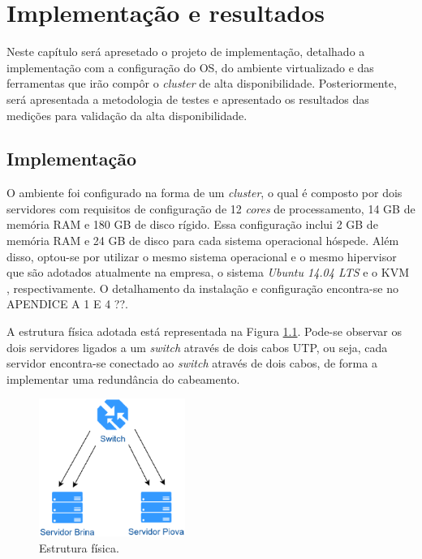 \chapter{Implementação e resultados}
\label{cap:implementacaoresultados}

Neste capítulo será apresetado o projeto de implementação, detalhado a implementação com a configuração do \ac{OS}, do ambiente virtualizado e 
das ferramentas que irão compôr o \textit{cluster} de alta disponibilidade. Posteriormente, será apresentada a metodologia de testes e 
apresentado os resultados das medições para validação da alta disponibilidade.

\section{Implementação}
\label{section:implementacao}

O ambiente foi configurado na forma de um \textit{cluster}, o qual é composto por dois servidores com requisitos de configuração 
de 12 \textit{cores} de processamento, 14 GB de memória \ac{RAM} e 180 GB de disco rígido.
Essa configuração inclui 2 GB de memória \ac{RAM} e 24 GB de disco para cada sistema operacional hóspede. Além disso, optou-se por utilizar o 
mesmo sistema operacional e o mesmo hipervisor que são adotados atualmente na empresa, o sistema \textit{Ubuntu 14.04 \ac{LTS}} e o \ac{KVM} 
\cite{kvm}, respectivamente. O detalhamento da instalação e configuração encontra-se no APENDICE A 1 E 4 ??.

A estrutura física adotada está representada na Figura \ref{fig:projeto_fisico}. Pode-se observar os dois servidores ligados a um 
\textit{switch} através de dois cabos UTP, ou seja, cada servidor encontra-se conectado ao \textit{switch} através de dois cabos, de forma a 
implementar uma redundância do cabeamento.

\begin{figure}[h!]
 \centering
 \includegraphics[width=180px]{img/projeto_fisico.eps}
 \caption{Estrutura física.}
 \label{fig:projeto_fisico}
\end{figure}

